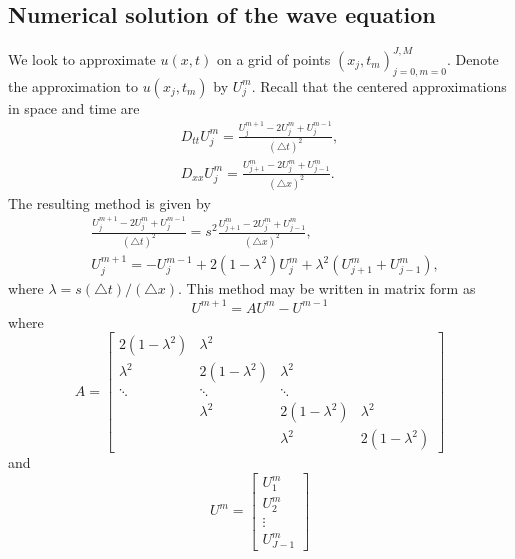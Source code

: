 \subsection*{Numerical solution of the wave equation}
We look to approximate $u(x,t)$ on a grid of points $(x_j,t_m)_{j=0,m=0}^{J,M}$.
Denote the approximation to $u(x_j,t_m)$ by $U_{j}^{m}$.
Recall that the centered approximations in space and time are
\begin{align*}
D_{tt} U_{j}^{m} = \frac{U_{j}^{m+1} -2 U_{j}^{m} + U_{j}^{m-1}}{(\triangle t)^2} ,\\
D_{xx} U_{j}^{m} = \frac{U_{j+1}^{m} -2 U_{j}^{m} + U_{j-1}^{m}}{(\triangle x)^2} .
\end{align*}
% 
The resulting method is given by 
\begin{align*}
	&\frac{U_{j}^{m+1} -2 U_{j}^{m} + U_{j}^{m-1}}{(\triangle t)^2} = s^2 \frac{U_{j+1}^{m} -2 U_{j}^{m} + U_{j-1}^{m}}{(\triangle x)^2}, \\
	&U_{j}^{m+1} =  - U_{j}^{m-1} + 2 (1-\lambda^2) U_{j}^{m} + \lambda ^2 (U_{j+1}^{m} + U_{j-1}^{m}),
\end{align*}
where $ \lambda  =  s(\triangle t)/(\triangle x)$.
This method may be written in matrix form as 
\[U^{m+1} = AU^{m} - U^{m-1} \]
where 
\[A = 
\left[\begin{array}{cccc}2(1-\lambda^2) & \lambda^2 &  &  \\ \lambda^2 & 2(1-\lambda^2) & \lambda^2 &  \\ \ddots & \ddots & \ddots &  \\ & \lambda^2 & 2(1-\lambda^2) & \lambda^2 \\  &  & \lambda^2 & 2(1-\lambda^2)\end{array}\right]\]
and
\[U^m = \left[\begin{array}{c}U_{1}^{m} \\U_{2}^{m} \\\vdots \\U_{J-1}^{m}\end{array}\right]\]

